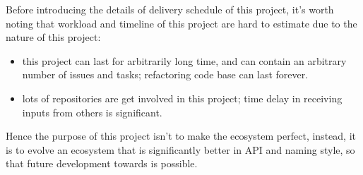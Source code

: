 Before introducing the details of delivery schedule of this project, it's worth noting that workload and timeline of this project are hard to estimate due to the nature of this project:
\begin{itemize}
    \item this project can last for arbitrarily long time, and can contain an arbitrary number of issues and tasks; refactoring code base can last forever.
    \item lots of repositories are get involved in this project; time delay in receiving inputs from others is significant.
\end{itemize}
Hence the purpose of this project isn't to make the ecosystem perfect, instead, it is to evolve an ecosystem that is significantly better in API and naming style, so that future development towards \images{}  is possible.
